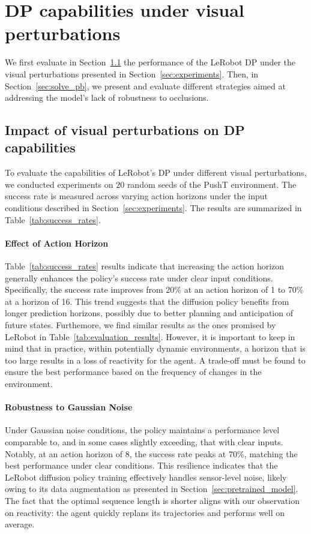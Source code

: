\section{DP capabilities under visual perturbations}\label{sec:results}
We first evaluate in Section~\ref{sec:vis_impact} the performance of the LeRobot DP under the visual perturbations presented in Section~\ref{sec:experiments}.
Then, in Section~\ref{sec:solve_pb}, we present and evaluate different strategies aimed at addressing the model's lack of robustness to occlusions.

\subsection{Impact of visual perturbations on DP capabilities}\label{sec:vis_impact}
To evaluate the capabilities of LeRobot's DP under different visual perturbations, we conducted experiments on $20$ random seeds of the PushT environment.
The success rate is measured across varying action horizons under the input conditions described in Section~\ref{sec:experiments}.
The results are summarized in Table~\ref{tab:success_rates}.

\paragraph{Effect of Action Horizon}

Table~\ref{tab:success_rates} results indicate that increasing the action horizon generally enhances the policy's success rate under clear input conditions.
Specifically, the success rate improves from 20\% at an action horizon of 1 to 70\% at a horizon of 16.
This trend suggests that the diffusion policy benefits from longer prediction horizons, possibly due to better planning and anticipation of future states.
Furthemore, we find similar results as the ones promised by LeRobot in Table~\ref{tab:evaluation_results}.
However, it is important to keep in mind that in practice, within potentially dynamic environments,
a horizon that is too large results in a loss of reactivity for the agent.
A trade-off must be found to ensure the best performance based on the frequency of changes in the environment.

\paragraph{Robustness to Gaussian Noise}
Under Gaussian noise conditions, the policy maintains a performance level comparable to, and in some cases slightly exceeding, that with clear inputs.
Notably, at an action horizon of 8, the success rate peaks at 70\%, matching the best performance under clear conditions.
This resilience indicates that the LeRobot diffusion policy training effectively handles sensor-level noise, likely owing to its data augmentation as presented in Section~\ref{sec:pretrained_model}.
The fact that the optimal sequence length is shorter aligns with our observation on reactivity: the
agent quickly replans its trajectories and performs well on average.

